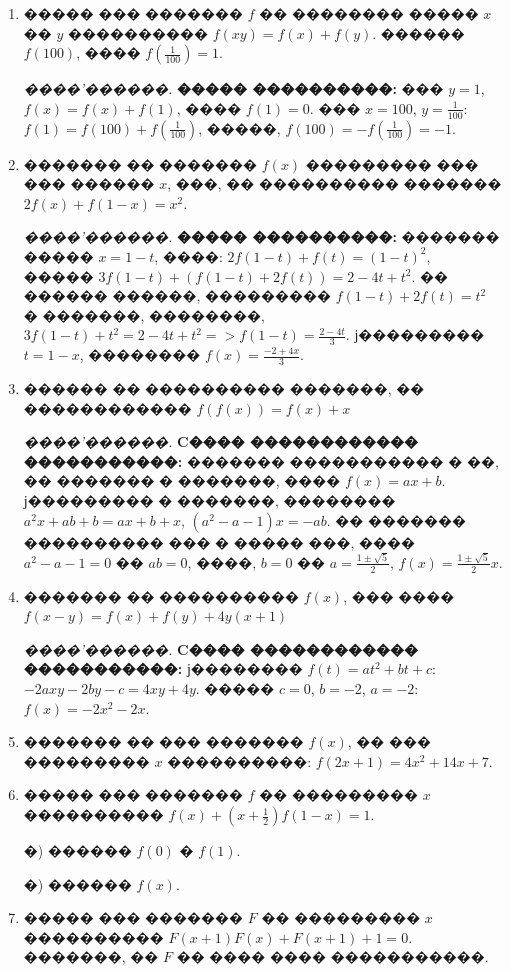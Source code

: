 \documentclass[a4paper,12pt]{article}
\begin{document}
\begin{enumerate}
\item ����� ��� ������� $f$ �� �������� ����� $x$ �� $y$ ���������� $f(xy)=f(x)+f(y).$ ������ $f(100)$, ���� $f(\frac{1}{100})=1$.

\textit{����'������.} \textbf{����� ����������:} ��� $y=1$, $f(x) = f(x) + f(1)$, ���� $f(1)=0$. ��� $x=100$, $y=\frac{1}{100}$: $f(1)=f(100)+f(\frac{1}{100})$, �����, $f(100)=-f(\frac{1}{100})=-1$.

\item ������� �� ������� $f(x)$ ��������� ��� ��� ������ $x$, ���, �� ���������� ������� $2f(x)+f(1-x)=x^{2}.$

\textit{����'������.} \textbf{����� ����������:} ������� ����� $x=1-t$, ����: $2f(1-t)+f(t)=(1-t)^{2}$, ����� $3f(1-t)+(f(1-t)+2f(t))=2-4t+t^{2}$. �� ������ ������, ��������� $f(1-t)+2f(t)=t^{2}$ � �������, ��������, $3f(1-t)+t^{2}=2-4t+t^{2} => f(1-t)=\frac{2-4t}{3}$. ϳ��������� $t=1-x$, �������� $f(x)=\frac{-2+4x}{3}$.

\item ������ �� ���������� �������, �� ������������ $f(f(x))=f(x)+x$

\textit{����'������.} \textbf{C���� ������������ �����������:} ������� ����������� � ��, �� ������� � �������, ���� $f(x)=ax+b$. ϳ��������� � �������, �������� $a^{2}x+ab+b=ax+b+x$, $(a^{2}-a-1)x=-ab$. �� ������� ���������� ��� � ����� ���, ���� $a^{2}-a-1=0$ �� $ab=0$, ����, $b=0$ �� $a=\frac{1\pm\sqrt{5}}{2}$, $f(x)=\frac{1\pm\sqrt{5}}{2} x$.

\item ������� �� ���������� $f(x)$, ��� ���� $f(x-y)=f(x)+f(y) + 4y(x+1)$

\textit{����'������.}  \textbf{C���� ������������ �����������:} ϳ�������� $f(t)=at^{2}+bt+c$: $-2axy-2by-c=4xy+4y$. ����� $c=0$, $b=-2$, $a=-2$: $f(x)=-2x^{2}-2x$.

\item ������� �� ��� ������� $f(x)$, �� ��� ��������� $x$ ����������: $f(2x+1)=4x^{2}+14x+7.$

\item ����� ��� ������� $f$ �� ��������� $x$ ���������� $f(x)+(x+\frac{1}{2})f(1-x)=1.$

�) ������ $f(0)$ � $f(1)$.

�) ������ $f(x)$.

\item ����� ��� ������� $F$ �� ��������� $x$ ���������� $F(x+1)F(x)+F(x+1)+1=0.$ �������, �� $F$ �� ���� ���� �����������.


\end{enumerate}
\end{document}
